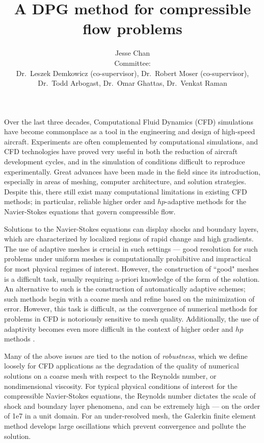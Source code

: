 \documentclass[12pt,letterpaper,oneside]{article}
\date{}
\author{Jesse Chan\\Committee: \vspace{-0.3cm}\\Dr.\ Leszek Demkowicz (co-supervisor), Dr.\ Robert Moser (co-supervisor),\vspace{-0.3cm}\\ Dr.\ Todd Arbogast, Dr.\ Omar Ghattas, Dr.\ Venkat Raman}
\title{A DPG method for compressible flow problems}
\begin{document}
\maketitle

Over the last three decades, Computational Fluid Dynamics (CFD) simulations have become commonplace as a tool in the engineering and design of high-speed aircraft.  Experiments are often complemented by computational simulations, and CFD technologies have proved very useful in both the reduction of aircraft development cycles, and in the simulation of conditions difficult to reproduce experimentally.  Great advances have been made in the field since its introduction, especially in areas of meshing, computer architecture, and solution strategies.  Despite this, there still exist many computational limitations in existing CFD methods; in particular, reliable higher order and $hp$-adaptive methods for the Navier-Stokes equations that govern compressible flow.

Solutions to the Navier-Stokes equations can display shocks and boundary layers, which are characterized by localized regions of rapid change and high gradients.  The use of adaptive meshes is crucial in such settings --- good resolution for such problems under uniform meshes is computationally prohibitive and impractical for most physical regimes of interest.  However, the construction of ``good" meshes is a difficult task, usually requiring a-priori knowledge of the form of the solution.  An alternative to such is the construction of automatically adaptive schemes; such methods begin with a coarse mesh and refine based on the minimization of error.  However, this task is difficult, as the convergence of numerical methods for problems in CFD is notoriously sensitive to mesh quality.  Additionally, the use of adaptivity becomes even more difficult in the context of higher order and $hp$ methods \cite{BoeingHigherOrder}.  

Many of the above issues are tied to the notion of \emph{robustness}, which we define loosely for CFD applications as the degradation of the quality of numerical solutions on a coarse mesh with respect to the Reynolds number, or nondimensional viscosity. For typical physical conditions of interest for the compressible Navier-Stokes equations, the Reynolds number dictates the scale of shock and boundary layer phenomena, and can be extremely high --- on the order of 1e7 in a unit domain.  For an under-resolved mesh, the Galerkin finite element method develops large oscillations which prevent convergence and pollute the solution.  
\end{document}
